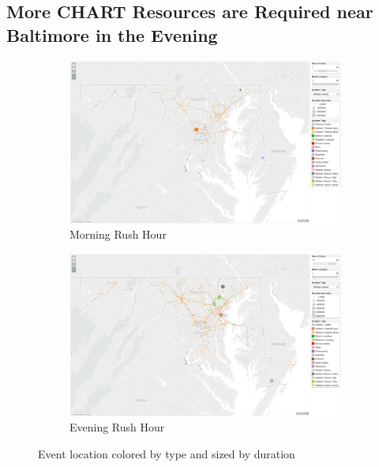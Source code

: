 \documentclass[11pt,letterpaper]{article}
\begin{document}
\subsection*{More CHART Resources are Required near Baltimore in the Evening}

\begin{figure}[h]
	\centering
	\begin{subfigure}{0.49\textwidth}
		\centering
		\includegraphics[width=\textwidth]{figures/morning_rush_hour.png}
		\caption{\textsf{Morning Rush Hour}}
        \label{fig:morning_rush_hour}
	\end{subfigure} \hfill
	\begin{subfigure}{0.49\textwidth}
		\centering
		\includegraphics[width=\textwidth]{figures/evening_rush_hour.png}
		\caption{Evening Rush Hour}
        \label{fig:evening_rush_hour}
	\end{subfigure}
    \caption{\textsf{Event location colored by type and sized by duration}}
    \label{fig:geo_rush_hour}
\end{figure}
\end{document}
